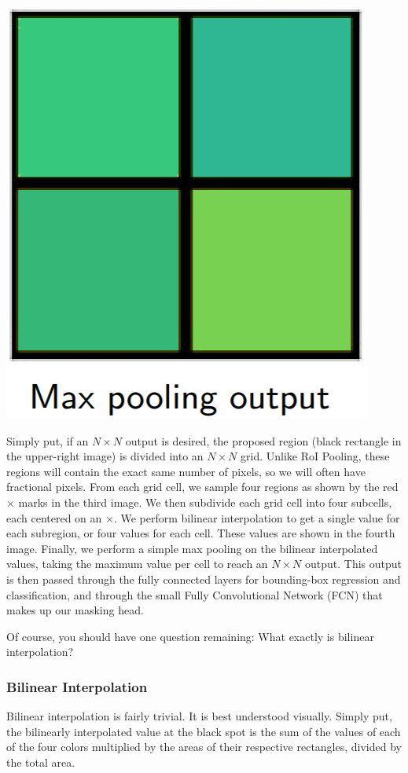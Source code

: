 \begin{center}
	\includegraphics[scale=0.35]{images/roialign5.PNG}
\end{center}

Simply put, if an $N\times N$ output is desired, the proposed region (black rectangle in the upper-right image) is divided into an $N\times N$ grid. Unlike RoI Pooling, these regions will contain the exact same number of pixels, so we will often have fractional pixels. From each grid cell, we sample four regions as shown by the red $\times$ marks in the third image. We then subdivide each grid cell into four subcells, each centered on an $\times$. We perform bilinear interpolation to get a single value for each subregion, or four values for each cell. These values are shown in the fourth image. Finally, we perform a simple max pooling on the bilinear interpolated values, taking the maximum value per cell to reach an $N\times N$ output. This output is then passed through the fully connected layers for bounding-box regression and classification, and through the small Fully Convolutional Network (FCN) that makes up our masking head.

Of course, you should have one question remaining: What exactly is bilinear interpolation?

\subsubsection{Bilinear Interpolation}
Bilinear interpolation is fairly trivial. It is best understood visually. Simply put, the bilinearly interpolated value at the black spot is the sum of the values of each of the four colors multiplied by the areas of their respective rectangles, divided by the total area.

